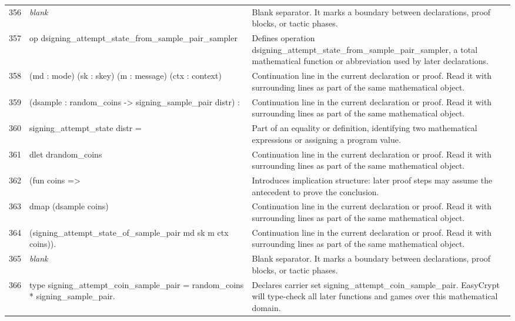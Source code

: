 \documentclass[10pt]{article}
\begin{document}
\begin{longtable}{r L{0.53\textwidth} L{0.37\textwidth}}
356 & {\ttfamily\scriptsize \emph{blank}} & Blank separator.  It marks a boundary between declarations, proof blocks, or tactic phases. \\
357 & {\ttfamily\scriptsize op dsigning\_attempt\_state\_from\_sample\_pair\_sampler} & Defines operation dsigning\_attempt\_state\_from\_sample\_pair\_sampler, a total mathematical function or abbreviation used by later declarations. \\
358 & {\ttfamily\scriptsize    (md : mode) (sk : skey) (m : message) (ctx : context)} & Continuation line in the current declaration or proof.  Read it with surrounding lines as part of the same mathematical object. \\
359 & {\ttfamily\scriptsize    (dsample : random\_coins -> signing\_sample\_pair distr) :} & Continuation line in the current declaration or proof.  Read it with surrounding lines as part of the same mathematical object. \\
360 & {\ttfamily\scriptsize    signing\_attempt\_state distr =} & Part of an equality or definition, identifying two mathematical expressions or assigning a program value. \\
361 & {\ttfamily\scriptsize   dlet drandom\_coins} & Continuation line in the current declaration or proof.  Read it with surrounding lines as part of the same mathematical object. \\
362 & {\ttfamily\scriptsize     (fun coins =>} & Introduces implication structure: later proof steps may assume the antecedent to prove the conclusion. \\
363 & {\ttfamily\scriptsize       dmap (dsample coins)} & Continuation line in the current declaration or proof.  Read it with surrounding lines as part of the same mathematical object. \\
364 & {\ttfamily\scriptsize         (signing\_attempt\_state\_of\_sample\_pair md sk m ctx coins)).} & Continuation line in the current declaration or proof.  Read it with surrounding lines as part of the same mathematical object. \\
365 & {\ttfamily\scriptsize \emph{blank}} & Blank separator.  It marks a boundary between declarations, proof blocks, or tactic phases. \\
366 & {\ttfamily\scriptsize type signing\_attempt\_coin\_sample\_pair = random\_coins * signing\_sample\_pair.} & Declares carrier set signing\_attempt\_coin\_sample\_pair.  EasyCrypt will type-check all later functions and games over this mathematical domain. \\

\end{longtable}
\end{document}
